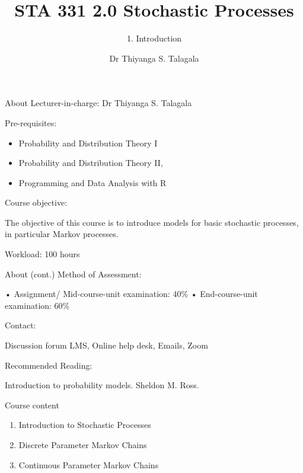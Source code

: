 \documentclass[12pt,ignorenonframetext,]{beamer}
\title[]{STA 331 2.0 Stochastic Processes}
\subtitle{1. Introduction}
\author[
        Dr Thiyanga S. Talagala
    ]{Dr Thiyanga S. Talagala}
\institute[
    ]{
    Department of Statistics, University of Sri Jayewardenepura
    }
\date[
      
  ]{
    }
\begin{document}
  \begin{frame}[plain]
  \titlepage
  \end{frame}



\begin{frame}{About}
\protect\hypertarget{about}{}
Lecturer-in-charge: Dr Thiyanga S. Talagala

Pre-requisites:

\begin{itemize}
\item
  Probability and Distribution Theory I
\item
  Probability and Distribution Theory II,
\item
  Programming and Data Analysis with R
\end{itemize}

Course objective:

The objective of this course is to introduce models for basic stochastic
processes, in particular Markov processes.

Workload: 100 hours
\end{frame}

\begin{frame}{About (cont.)}
\protect\hypertarget{about-cont.}{}
Method of Assessment:

• Assignment/ Mid-course-unit examination: 40\% • End-course-unit
examination: 60\%

Contact:

Discussion forum LMS, Online help desk, Emails, Zoom

Recommended Reading:

Introduction to probability models. Sheldon M. Ross.
\end{frame}

\begin{frame}{Course content}
\protect\hypertarget{course-content}{}
\begin{enumerate}
\item
  Introduction to Stochastic Processes
\item
  Discrete Parameter Markov Chains
\item
  Continuous Parameter Markov Chains
\end{enumerate}
\end{frame}
\end{document}
